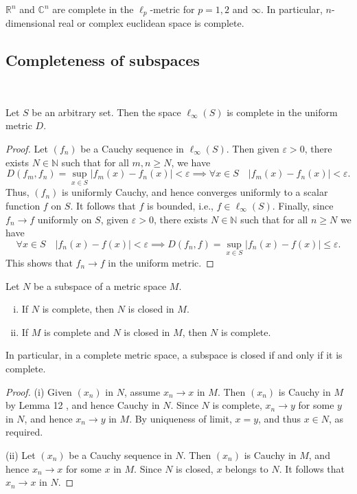 \documentclass[a4paper]{article}
\begin{document}
\begin{corollary}
$\mathbb{R}^n$ and $\mathbb{C}^n$ are complete in the $\ell_p$-metric for $p=1,2$ and $\infty$. In particular, $n$-dimensional real or complex euclidean space is complete.
\end{corollary}

\subsection{Completeness of subspaces}\ \vspace{-1.5em}

\begin{theorem}
    Let $S$ be an arbitrary set. Then the space $\ell_{\infty}(S)$ is complete in the uniform metric $D$.
\end{theorem}
\begin{proof}
    Let $\left(f_n\right)$ be a Cauchy sequence in $\ell_{\infty}(S)$. Then given $\varepsilon>0$, there exists $N \in \mathbb{N}$ such that for all $m, n \geqslant N$, we have
    \[
        D\left(f_m, f_n\right)=\sup _{x \in S}\left|f_m(x)-f_n(x)\right|<\varepsilon \implies \forall x \in S \quad\left|f_m(x)-f_n(x)\right|<\varepsilon.
    \]
    Thus, $\left(f_n\right)$ is uniformly Cauchy, and hence converges uniformly to a scalar function $f$ on $S$. It follows that $f$ is bounded, i.e., $f \in \ell_{\infty}(S)$. Finally, since $f_n \rightarrow f$ uniformly on $S$, given $\varepsilon>0$, there exists $N \in \mathbb{N}$ such that for all $n \geqslant N$ we have
    \[
        \forall x \in S \quad\left|f_n(x)-f(x)\right|<\varepsilon \implies D\left(f_n, f\right)=\sup _{x \in S}\left|f_n(x)-f(x)\right| \leqslant \varepsilon.
    \]
    This shows that $f_n \rightarrow f$ in the uniform metric.
\end{proof}

\begin{proposition}
    Let $N$ be a subspace of a metric space $M$.
    \begin{enumerate}[(i)]
        \item If $N$ is complete, then $N$ is closed in $M$.
        \item If $M$ is complete and $N$ is closed in $M$, then $N$ is complete.
    \end{enumerate}In particular, in a complete metric space, a subspace is closed if and only if it is complete.
\end{proposition}
\begin{proof}
    (i) Given $\left(x_n\right)$ in $N$, assume $x_n \rightarrow x$ in $M$. Then $\left(x_n\right)$ is Cauchy in $M$ by Lemma 12 , and hence Cauchy in $N$. Since $N$ is complete, $x_n \rightarrow y$ for some $y$ in $N$, and hence $x_n \rightarrow y$ in $M$. By uniqueness of limit, $x=y$, and thus $x \in N$, as required.

    (ii) Let $\left(x_n\right)$ be a Cauchy sequence in $N$. Then $\left(x_n\right)$ is Cauchy in $M$, and hence $x_n \rightarrow x$ for some $x$ in $M$. Since $N$ is closed, $x$ belongs to $N$. It follows that $x_n \rightarrow x$ in $N$.
\end{proof}
\end{document}
